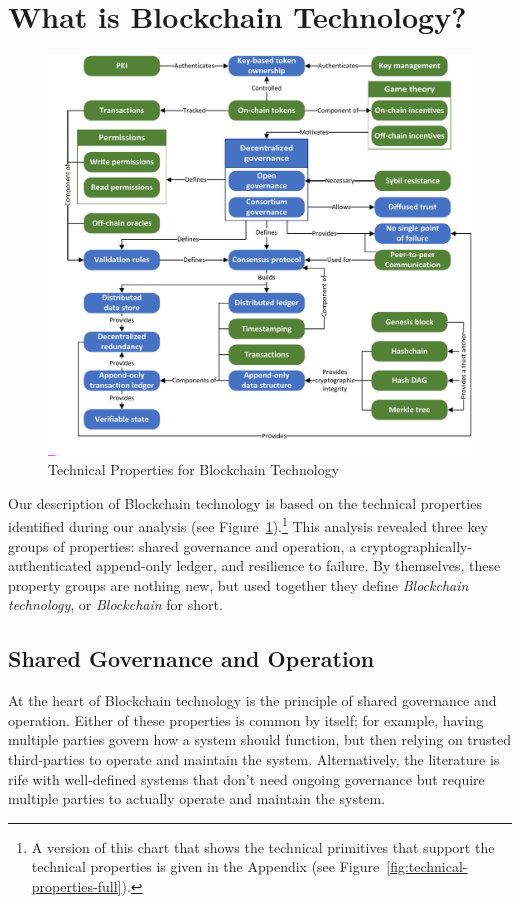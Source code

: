 
\section{What is Blockchain Technology?}
\begin{figure}
	\centering
	\includegraphics[page=2,width=\columnwidth]{figures/grounded-theory-main}
	
	\caption{Technical Properties for Blockchain Technology}
	\label{fig:technical-properties}
\end{figure}

\label{sec:blockchain}
Our description of Blockchain technology is based on the technical properties identified during our analysis (see Figure~\ref{fig:technical-properties}).\footnote{A version of this chart that shows the technical primitives that support the technical properties is given in the Appendix (see Figure~\ref{fig:technical-properties-full}).}
This analysis revealed three key groups of properties: shared governance and operation, a cryptographically-authenticated append-only ledger, and resilience to failure.
By themselves, these property groups are nothing new, but used together they define \emph{Blockchain technology}, or \emph{Blockchain} for short.

\subsection{Shared Governance and Operation}
At the heart of Blockchain technology is the principle of shared governance and operation.
Either of these properties is common by itself; for example, having multiple parties govern how a system should function, but then relying on trusted third-parties to operate and maintain the system.
Alternatively, the literature is rife with well-defined systems that don't need ongoing governance but require multiple parties to actually operate and maintain the system.

